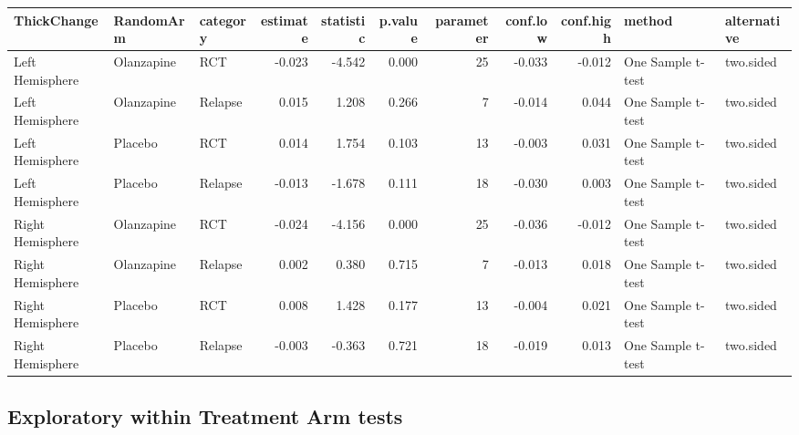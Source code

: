 \documentclass[]{article}
\theoremstyle{definition}
\theoremstyle{definition}
\theoremstyle{definition}
\theoremstyle{remark}
\begin{document}
\begin{tabular}{l|l|l|r|r|r|r|r|r|l|l}
\hline
ThickChange & RandomArm & category & estimate & statistic & p.value & parameter & conf.low & conf.high & method & alternative\\
\hline
Left Hemisphere & Olanzapine & RCT & -0.023 & -4.542 & 0.000 & 25 & -0.033 & -0.012 & One Sample t-test & two.sided\\
\hline
Left Hemisphere & Olanzapine & Relapse & 0.015 & 1.208 & 0.266 & 7 & -0.014 & 0.044 & One Sample t-test & two.sided\\
\hline
Left Hemisphere & Placebo & RCT & 0.014 & 1.754 & 0.103 & 13 & -0.003 & 0.031 & One Sample t-test & two.sided\\
\hline
Left Hemisphere & Placebo & Relapse & -0.013 & -1.678 & 0.111 & 18 & -0.030 & 0.003 & One Sample t-test & two.sided\\
\hline
Right Hemisphere & Olanzapine & RCT & -0.024 & -4.156 & 0.000 & 25 & -0.036 & -0.012 & One Sample t-test & two.sided\\
\hline
Right Hemisphere & Olanzapine & Relapse & 0.002 & 0.380 & 0.715 & 7 & -0.013 & 0.018 & One Sample t-test & two.sided\\
\hline
Right Hemisphere & Placebo & RCT & 0.008 & 1.428 & 0.177 & 13 & -0.004 & 0.021 & One Sample t-test & two.sided\\
\hline
Right Hemisphere & Placebo & Relapse & -0.003 & -0.363 & 0.721 & 18 & -0.019 & 0.013 & One Sample t-test & two.sided\\
\hline
\end{tabular}

\subsection{Exploratory within Treatment Arm
tests}\label{exploratory-within-treatment-arm-tests}
\end{document}
